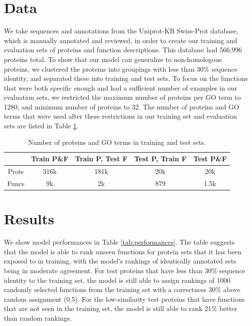 \documentclass{article}
\begin{document}
\section{Data}
We take sequences and annotations from the Uniprot-KB Swiss-Prot database, which is manually annotated and reviewed, in order to create our training and evaluation sets of proteins and function descriptions. 
This database had 566,996 proteins total. 
To show that our model can generalize to non-homologous proteins, we clustered the proteins into groupings with less than 30\% sequence identity, and separated these into training and test sets. 
To focus on the functions that were both specific enough and had a sufficient number of examples in our evaluation sets, we restricted the maximum number of proteins per GO term to 1280, and minimum number of proteins to 32. 
The number of proteins and GO terms that were used after these restrictions in our training set and evaluation sets are listed in Table \ref{tab:datasets}.
\begin{table}
    \caption{Number of proteins and GO terms in training and test sets.}
	\centering
	\begin{tabular}{c|cccc}
		\toprule
         & Train P\&F & Train P, Test F & Test P, Train F & Test P\&F \\
		\midrule
        Prots & 316k & 181k & 20k & 20k \\
        Funcs & 9k & 2k & 879 & 1.5k \\
		\bottomrule
	\end{tabular}
	\label{tab:datasets}
\end{table}

\section{Results} %

        We show model performances in Table \ref{tab:performances}. The table suggests that the model is able to rank unseen functions for protein sets that it has been exposed to in training, with the model's rankings of identically annotated sets being in moderate agreement. For test proteins that have less than 30\% sequence identity to the training set, the model is still able to assign rankings of 1000 randomly selected functions from the training set with a correctness 30\% above random assignment (0.5). For the low-similarity test proteins that have functions that are not seen in the training set, the model is still able to rank 21\% better than random rankings.
\end{document}
